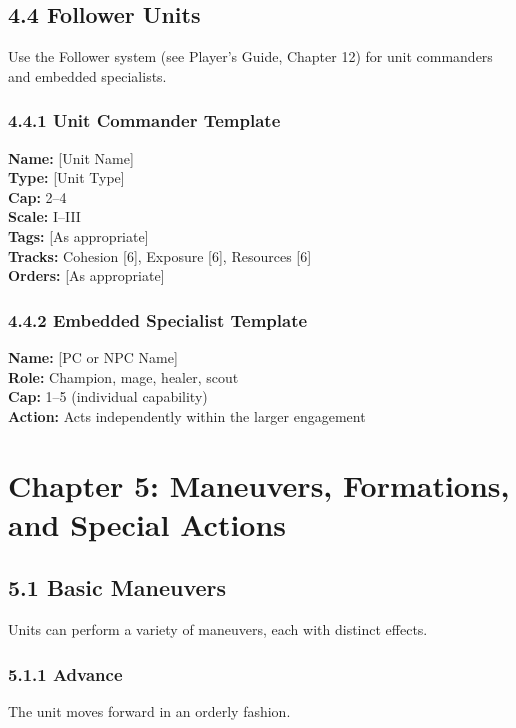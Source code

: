 \documentclass[11pt]{article}
\begin{document}
\subsection{4.4 Follower Units}

Use the Follower system (see Player's Guide, Chapter 12) for unit commanders and embedded specialists.

\subsubsection{4.4.1 Unit Commander Template}

\textbf{Name:} [Unit Name]\\
\textbf{Type:} [Unit Type]\\
\textbf{Cap:} 2–4\\
\textbf{Scale:} I–III\\
\textbf{Tags:} [As appropriate]\\
\textbf{Tracks:} Cohesion [6], Exposure [6], Resources [6]\\
\textbf{Orders:} [As appropriate]

\subsubsection{4.4.2 Embedded Specialist Template}

\textbf{Name:} [PC or NPC Name]\\
\textbf{Role:} Champion, mage, healer, scout\\
\textbf{Cap:} 1–5 (individual capability)\\
\textbf{Action:} Acts independently within the larger engagement

\section{Chapter 5: Maneuvers, Formations, and Special Actions}

\subsection{5.1 Basic Maneuvers}

Units can perform a variety of maneuvers, each with distinct effects.

\subsubsection{5.1.1 Advance}

The unit moves forward in an orderly fashion.
\end{document}

